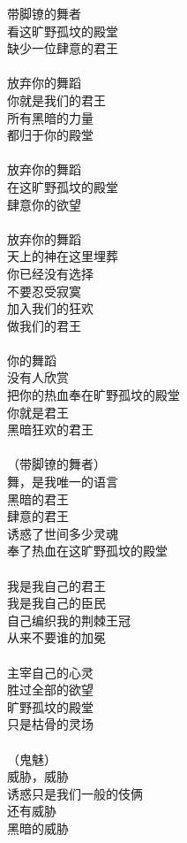 带脚镣的舞者\\
看这旷野孤坟的殿堂\\
缺少一位肆意的君王\\
\\
放弃你的舞蹈\\
你就是我们的君王\\
所有黑暗的力量\\
都归于你的殿堂\\
\\
放弃你的舞蹈\\
在这旷野孤坟的殿堂\\
肆意你的欲望\\
\\
放弃你的舞蹈\\
天上的神在这里埋葬\\
你已经没有选择\\
不要忍受寂寞\\
加入我们的狂欢\\
做我们的君王\\
\\
你的舞蹈\\
没有人欣赏\\
把你的热血奉在旷野孤坟的殿堂\\
你就是君王\\
黑暗狂欢的君王\\
\\
（带脚镣的舞者）\\
舞，是我唯一的语言\\
黑暗的君王\\
肆意的君王\\
诱惑了世间多少灵魂\\
奉了热血在这旷野孤坟的殿堂\\
\\
我是我自己的君王\\
我是我自己的臣民\\
自己编织我的荆棘王冠\\
从来不要谁的加冕\\
\\
主宰自己的心灵\\
胜过全部的欲望\\
旷野孤坟的殿堂\\
只是枯骨的灵场\\
\\
（鬼魅）\\
威胁，威胁\\
诱惑只是我们一般的伎俩\\
还有威胁\\
黑暗的威胁\\
